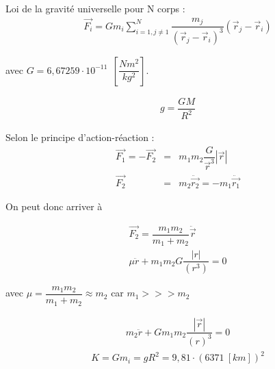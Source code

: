 \documentclass{report}
\begin{document}
Loi de la gravité universelle pour N corps :
\begin{eqnarray}
\vec{F_i}= G m_i \sum_{i=1,j\ne 1}^N \dfrac{m_j}{(\vec{r}_j-\vec{r}_i)^3}(\vec{r}_j-\vec{r}_i)
\end{eqnarray}

avec $G=6,67259\cdot10^{-11}~~\left[\dfrac{Nm^2}{kg^2}\right]$.

\begin{eqnarray}
g = \dfrac{GM}{R^2}
\end{eqnarray}

Selon le principe d'action-réaction :
\begin{eqnarray}
\vec{F_1}=-\vec{F_2} &= &m_1m_2\dfrac{G}{\vec{r}^3}|\vec{r}|\\
\vec{F_2} &= &m_2\ddot{\vec{r_2}}=-m_1\ddot{\vec{r_1}}
\end{eqnarray}

On peut donc arriver à

\begin{eqnarray}
\vec{F_2}=\dfrac{m_1m_2}{m_1+m_2}\ddot{\vec{r}}\\
\boxed{\mu \ddot{r}+m_1m_2G\dfrac{|r|}{(r^3)}=0}
\end{eqnarray}

avec $\mu=\dfrac{m_1m_2}{m_1+m_2}\approx m_2$ car $m_1>>>m_2$

\begin{eqnarray}
\boxed{m_2\ddot{r}+Gm_1m_2\dfrac{|\vec{r}|}{(r)^3}=0}
\end{eqnarray}
\begin{eqnarray}
K = Gm_i=gR^2=9,81\cdot (6371~[km])^2
\end{eqnarray}
\end{document}
